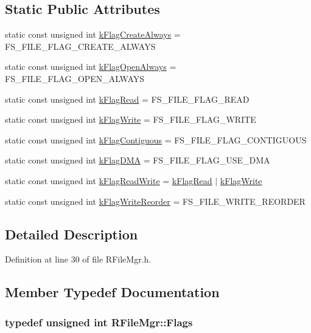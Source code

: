 \subsection*{Static Public Attributes}
\begin{CompactItemize}
\item 
static const unsigned int \hyperlink{class_r_file_mgr_7a2b1f90a235a749b3c08e2839ceb16b}{kFlagCreateAlways} = FS\_\-FILE\_\-FLAG\_\-CREATE\_\-ALWAYS
\item 
static const unsigned int \hyperlink{class_r_file_mgr_d7c0ae342eb6917fac67e2e7fa48c3d1}{kFlagOpenAlways} = FS\_\-FILE\_\-FLAG\_\-OPEN\_\-ALWAYS
\item 
static const unsigned int \hyperlink{class_r_file_mgr_cf4103da9315f00f0ca524c2f263a1b4}{kFlagRead} = FS\_\-FILE\_\-FLAG\_\-READ
\item 
static const unsigned int \hyperlink{class_r_file_mgr_d50cfef45d5e20a1de1abc17c0691067}{kFlagWrite} = FS\_\-FILE\_\-FLAG\_\-WRITE
\item 
static const unsigned int \hyperlink{class_r_file_mgr_5be34be75972f8996d64b9310cbb1e27}{kFlagContiguous} = FS\_\-FILE\_\-FLAG\_\-CONTIGUOUS
\item 
static const unsigned int \hyperlink{class_r_file_mgr_6e99814567b23b9c78cb6c67297b195c}{kFlagDMA} = FS\_\-FILE\_\-FLAG\_\-USE\_\-DMA
\item 
static const unsigned int \hyperlink{class_r_file_mgr_9c85e5ddcd9516e3b05e57b539cae3d9}{kFlagReadWrite} = \hyperlink{class_r_file_mgr_cf4103da9315f00f0ca524c2f263a1b4}{kFlagRead} $|$ \hyperlink{class_r_file_mgr_d50cfef45d5e20a1de1abc17c0691067}{kFlagWrite}
\item 
static const unsigned int \hyperlink{class_r_file_mgr_8b1ee35639a13fda3783e38664d747ba}{kFlagWriteReorder} = FS\_\-FILE\_\-WRITE\_\-REORDER
\end{CompactItemize}


\subsection{Detailed Description}


Definition at line 30 of file RFileMgr.h.

\subsection{Member Typedef Documentation}
\hypertarget{class_r_file_mgr_9ef0b4d0c3994a3aa8b0c76fe693038d}{
\subsubsection[{Flags}]{\setlength{\rightskip}{0pt plus 5cm}typedef unsigned int {\bf RFileMgr::Flags}}}
\label{class_r_file_mgr_9ef0b4d0c3994a3aa8b0c76fe693038d}




